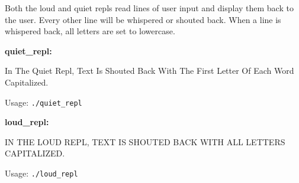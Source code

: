 \documentclass[12pt]{article}
\begin{document}
\begin{center}
Both the loud and quiet repls read lines of user input and display them back to the user. Every other line will be whispered or shouted back. When a line is whispered back, all letters are set to lowercase.

\textbf{quiet\_repl:}

In The Quiet Repl, Text Is Shouted Back With The First Letter Of Each Word Capitalized.

Usage: \texttt{./quiet\_repl}

\textbf{loud\_repl:}

IN THE LOUD REPL, TEXT IS SHOUTED BACK WITH ALL LETTERS CAPITALIZED.

Usage: \texttt{./loud\_repl}

\end{center}
\end{document}
